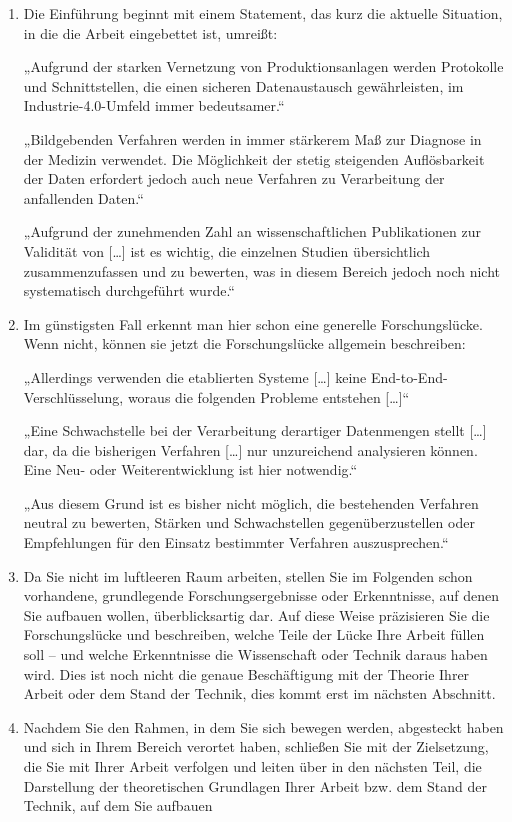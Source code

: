 \documentclass{article}
\begin{document}
\begin{enumerate}
    \item Die Einführung beginnt mit einem Statement, das kurz die aktuelle Situation, in die die Arbeit eingebettet ist, umreißt:

„Aufgrund der starken Vernetzung von Produktionsanlagen werden Protokolle und Schnittstellen, die einen sicheren Datenaustausch gewährleisten, im Industrie-4.0-Umfeld immer bedeutsamer.“

„Bildgebenden Verfahren werden in immer stärkerem Maß zur Diagnose in der Medizin verwendet. Die Möglichkeit der stetig steigenden Auflösbarkeit der Daten erfordert jedoch auch neue Verfahren zu Verarbeitung der anfallenden Daten.“

„Aufgrund der zunehmenden Zahl an wissenschaftlichen Publikationen zur Validität von […] ist es wichtig, die einzelnen Studien übersichtlich zusammenzufassen und zu bewerten, was in diesem Bereich jedoch noch nicht systematisch durchgeführt wurde.“
    \item Im günstigsten Fall erkennt man hier schon eine generelle Forschungslücke. Wenn nicht, können sie jetzt die Forschungslücke allgemein beschreiben:

„Allerdings verwenden die etablierten Systeme […] keine End-to-End-Verschlüsselung, woraus die folgenden Probleme entstehen […]“

„Eine Schwachstelle bei der Verarbeitung derartiger Datenmengen stellt […] dar, da die bisherigen Verfahren […] nur unzureichend analysieren können. Eine Neu- oder Weiterentwicklung ist hier notwendig.“

„Aus diesem Grund ist es bisher nicht möglich, die bestehenden Verfahren neutral zu bewerten, Stärken und Schwachstellen gegenüberzustellen oder Empfehlungen für den Einsatz bestimmter Verfahren auszusprechen.“
    \item Da Sie nicht im luftleeren Raum arbeiten, stellen Sie im Folgenden schon vorhandene, grundlegende Forschungsergebnisse oder Erkenntnisse, auf denen Sie aufbauen wollen, überblicksartig dar.
Auf diese Weise präzisieren Sie die Forschungslücke und beschreiben, welche Teile der Lücke Ihre Arbeit füllen soll – und welche Erkenntnisse die Wissenschaft oder Technik daraus haben wird.
Dies ist noch nicht die genaue Beschäftigung mit der Theorie Ihrer Arbeit oder dem Stand der Technik, dies kommt erst im nächsten Abschnitt.
    \item 
Nachdem Sie den Rahmen, in dem Sie sich bewegen werden, abgesteckt haben und sich in Ihrem Bereich verortet haben, schließen Sie mit der Zielsetzung, die Sie mit Ihrer Arbeit verfolgen und leiten über in den nächsten Teil, die Darstellung der theoretischen Grundlagen Ihrer Arbeit bzw. dem Stand der Technik, auf dem Sie aufbauen
\end{enumerate}
\end{document}
